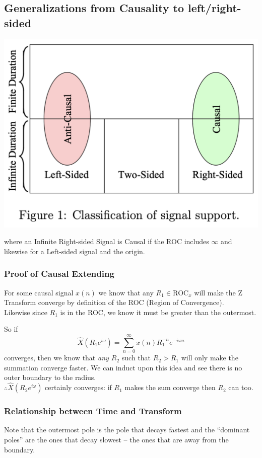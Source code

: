 \subsection{ Generalizations from Causality to left/right-sided}
\begin{center}
    \includegraphics[scale=0.25]{lectures/wk12/img/signal_classification.png}
\end{center}

where an Infinite Right-sided Signal is Causal if the ROC includes $\infty$ and likewise for a Left-sided signal and the origin.

\subsubsection{Proof of Causal Extending}
For some causal signal $x(n)$ we know that any $R_1\in\text{ROC}_x$ will make the Z Transform converge by definition of the ROC (Region of Convergence). \\
Likewise since $R_1$ is in the ROC, we know it must be greater than the outermost.

So if
\[
    \hat X(R_1 e^{i\omega}) = \sum_{n=0}^\infty x(n) R_1^{-n} e^{-i\omega n}
\]
converges, then we know that \textit{any $R_2$} such that $R_2 > R_1$ will only make the summation converge faster. We can induct upon this idea and see there is no outer boundary to the radius.\\
$\therefore \hat X(R_2 e^{i\omega})$ certainly converges: if $R_1$ makes the sum converge then $R_2$ can too.

\subsubsection{Relationship between Time and Transform}
Note that the outermost pole is the pole that decays fastest and the ``dominant poles'' are the ones that decay slowest -- the ones that are away from the boundary. 

